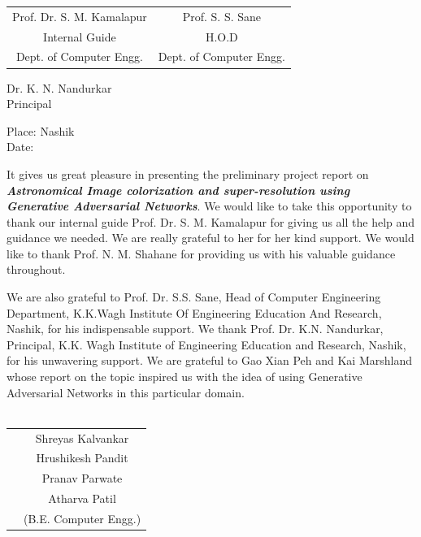 \documentclass[oneside,a4paper,12pt]{report}
\begin{document}
\bgroup
\def\arraystretch{0.7}
\begin{tabular}{c c }
Prof. Dr. S. M. Kamalapur &  \hspace{50 mm} Prof. S. S. Sane \\								
Internal Guide   &  \hspace{50 mm} H.O.D \\
Dept. of Computer Engg.  &	\hspace{50 mm}Dept. of Computer Engg.  \\
\end{tabular}
\vspace*{1\baselineskip} 
\begin{center}
{
Dr. K. N. Nandurkar \\
Principal\\
}
\end{center}
Place: Nashik\\
Date: 

{   \setlength{\parindent}{11mm} }
{ \setlength{\parindent}{0mm} }
\hspace{0.25 in}It gives us great pleasure in presenting the preliminary project report on \textbf{\textit{Astronomical Image colorization and super-resolution using Generative Adversarial Networks}}.
We would like to take this opportunity to thank our internal guide Prof. Dr. S. M. Kamalapur for giving us all the help and guidance we needed. We are really grateful to her for her kind support. We would like to thank Prof. N. M. Shahane for providing us with his valuable guidance throughout.

\hspace{0.25 in}We are also grateful to Prof. Dr. S.S. Sane, Head of Computer Engineering Department,
K.K.Wagh Institute Of Engineering Education And Research, Nashik,
for his indispensable support. We thank Prof. Dr. K.N. Nandurkar, Principal, K.K. Wagh Institute of Engineering Education and Research, Nashik, for his unwavering support.
We are grateful to Gao Xian Peh and Kai Marshland whose report on the topic inspired us with the idea of using Generative Adversarial Networks in this particular domain.\\
\vspace*{3\baselineskip} \\
\begin{tabular}{p{8.2cm}c}
&Shreyas Kalvankar\\
&Hrushikesh Pandit\\
&Pranav Parwate\\
&Atharva Patil\\
&(B.E. Computer Engg.)
\end{tabular}
\end{document}
